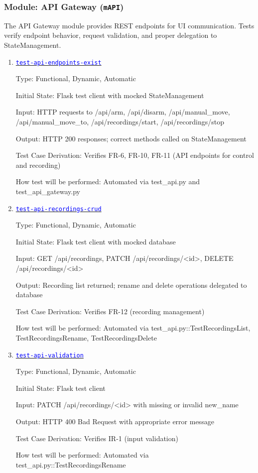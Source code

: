 \documentclass[12pt, titlepage]{article}
\newcommand{\mref}[1]{\texttt{#1}}
\newcommand{\tid}[1]{\hyperlink{tid:#1}{\textcolor{blue}{\texttt{#1}}}}
\begin{document}
\subsubsection{Module: API Gateway (\mref{mAPI})}

The API Gateway module provides REST endpoints for UI communication. Tests
verify endpoint behavior, request validation, and proper delegation to
StateManagement.

\begin{enumerate}

  \item{\tid{test-api-endpoints-exist}\\}

        Type: Functional, Dynamic, Automatic

        Initial State: Flask test client with mocked StateManagement

        Input: HTTP requests to /api/arm, /api/disarm, /api/manual\_move,
        /api/manual\_move\_to, /api/recordings/start, /api/recordings/stop

        Output: HTTP 200 responses; correct methods called on StateManagement

        Test Case Derivation: Verifies FR-6, FR-10, FR-11 (API endpoints for control
        and recording)

        How test will be performed: Automated via test\_api.py and
        test\_api\_gateway.py

  \item{\tid{test-api-recordings-crud}\\}

        Type: Functional, Dynamic, Automatic

        Initial State: Flask test client with mocked database

        Input: GET /api/recordings, PATCH /api/recordings/<id>, DELETE
        /api/recordings/<id>

        Output: Recording list returned; rename and delete operations delegated to
        database

        Test Case Derivation: Verifies FR-12 (recording management)

        How test will be performed: Automated via test\_api.py::TestRecordingsList,
        TestRecordingsRename, TestRecordingsDelete

  \item{\tid{test-api-validation}\\}

        Type: Functional, Dynamic, Automatic

        Initial State: Flask test client

        Input: PATCH /api/recordings/<id> with missing or invalid new\_name

        Output: HTTP 400 Bad Request with appropriate error message

        Test Case Derivation: Verifies IR-1 (input validation)

        How test will be performed: Automated via test\_api.py::TestRecordingsRename

\end{enumerate}
\end{document}
